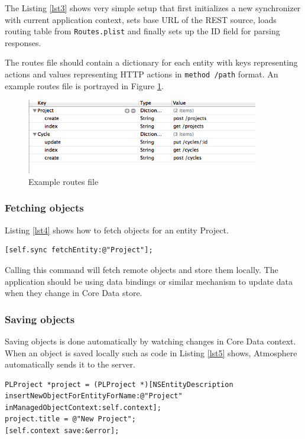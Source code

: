 The Listing \ref{lst3} shows very simple setup that first initializes a new synchronizer with current application context, sets base URL of the REST source, loads routing table from \texttt{Routes.plist} and finally sets up the ID field for parsing responses.

The routes file should contain a dictionary for each entity with keys representing actions and values representing HTTP actions in \texttt{method /path} format. An example routes file is portrayed in Figure \ref{fig:figures_routes-cocoa}.

\begin{figure}[htbp]
  \centering
    \includegraphics[width=4in]{figures/routes-cocoa.png}
  \caption{Example routes file}
  \label{fig:figures_routes-cocoa}
\end{figure}

\subsubsection{Fetching objects}

Listing \ref{lst4} shows how to fetch objects for an entity Project.

\begin{lstlisting}[caption=Fetching objects for an entity,label=lst4]
[self.sync fetchEntity:@"Project"];
\end{lstlisting}

Calling this command will fetch remote objects and store them locally. The application should be using data bindings or similar mechanism to update data when they change in Core Data store.

\subsubsection{Saving objects}

Saving objects is done automatically by watching changes in Core Data context. When an object is saved locally such as code in Listing \ref{lst5} shows, Atmosphere automatically sends it to the server.

\begin{lstlisting}[caption=Saving objects locally,label=lst5]
PLProject *project = (PLProject *)[NSEntityDescription insertNewObjectForEntityForName:@"Project" inManagedObjectContext:self.context];
project.title = @"New Project";
[self.context save:&error];
\end{lstlisting}